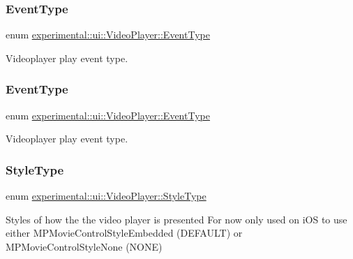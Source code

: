\subsubsection{\texorpdfstring{Event\+Type}{EventType}\hspace{0.1cm}{\footnotesize\ttfamily [1/2]}}
{\footnotesize\ttfamily enum \hyperlink{classexperimental_1_1ui_1_1VideoPlayer_a29899b427d61c030036fda6c5ddcb10a}{experimental\+::ui\+::\+Video\+Player\+::\+Event\+Type}\hspace{0.3cm}{\ttfamily [strong]}}

Videoplayer play event type. \mbox{\label{classexperimental_1_1ui_1_1VideoPlayer_a29899b427d61c030036fda6c5ddcb10a}} 
\subsubsection{\texorpdfstring{Event\+Type}{EventType}\hspace{0.1cm}{\footnotesize\ttfamily [2/2]}}
{\footnotesize\ttfamily enum \hyperlink{classexperimental_1_1ui_1_1VideoPlayer_a29899b427d61c030036fda6c5ddcb10a}{experimental\+::ui\+::\+Video\+Player\+::\+Event\+Type}\hspace{0.3cm}{\ttfamily [strong]}}

Videoplayer play event type. \mbox{\label{classexperimental_1_1ui_1_1VideoPlayer_a65711269d4eca8fe125aeda2928a80ec}} 
\subsubsection{\texorpdfstring{Style\+Type}{StyleType}}
{\footnotesize\ttfamily enum \hyperlink{classexperimental_1_1ui_1_1VideoPlayer_a65711269d4eca8fe125aeda2928a80ec}{experimental\+::ui\+::\+Video\+Player\+::\+Style\+Type}\hspace{0.3cm}{\ttfamily [strong]}}

Styles of how the the video player is presented For now only used on i\+OS to use either M\+P\+Movie\+Control\+Style\+Embedded (D\+E\+F\+A\+U\+LT) or M\+P\+Movie\+Control\+Style\+None (N\+O\+NE) 

